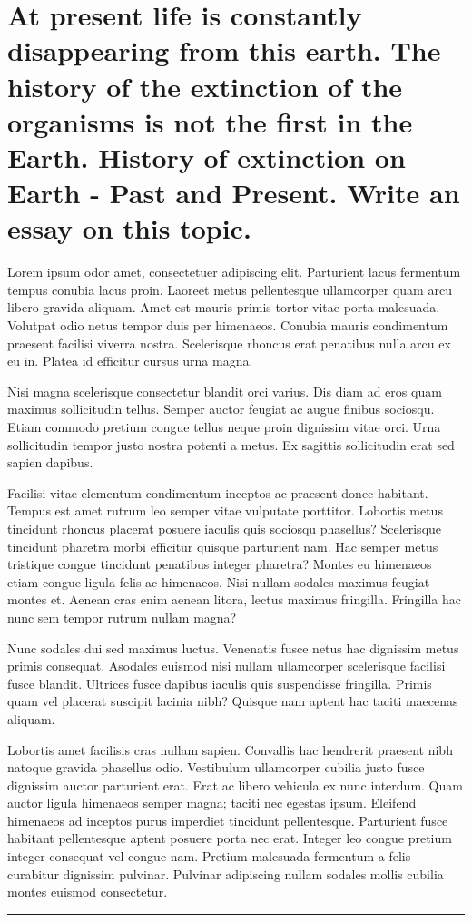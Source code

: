 \documentclass[12pt]{article}
\begin{document}
\section{At present life is constantly disappearing from this earth. The history of the extinction of the organisms is not the first in the Earth. History of extinction on Earth - Past and Present. Write an essay on this topic.}
Lorem ipsum odor amet, consectetuer adipiscing elit. Parturient lacus fermentum tempus conubia lacus proin. Laoreet metus pellentesque ullamcorper quam arcu libero gravida aliquam. Amet est mauris primis tortor vitae porta malesuada. Volutpat odio netus tempor duis per himenaeos. Conubia mauris condimentum praesent facilisi viverra nostra. Scelerisque rhoncus erat penatibus nulla arcu ex eu in. Platea id efficitur cursus urna magna.

Nisi magna scelerisque consectetur blandit orci varius. Dis diam ad eros quam maximus sollicitudin tellus. Semper auctor feugiat ac augue finibus sociosqu. Etiam commodo pretium congue tellus neque proin dignissim vitae orci. Urna sollicitudin tempor justo nostra potenti a metus. Ex sagittis sollicitudin erat sed sapien dapibus.

Facilisi vitae elementum condimentum inceptos ac praesent donec habitant. Tempus est amet rutrum leo semper vitae vulputate porttitor. Lobortis metus tincidunt rhoncus placerat posuere iaculis quis sociosqu phasellus? Scelerisque tincidunt pharetra morbi efficitur quisque parturient nam. Hac semper metus tristique congue tincidunt penatibus integer pharetra? Montes eu himenaeos etiam congue ligula felis ac himenaeos. Nisi nullam sodales maximus feugiat montes et. Aenean cras enim aenean litora, lectus maximus fringilla. Fringilla hac nunc sem tempor rutrum nullam magna?

Nunc sodales dui sed maximus luctus. Venenatis fusce netus hac dignissim metus primis consequat. Asodales euismod nisi nullam ullamcorper scelerisque facilisi fusce blandit. Ultrices fusce dapibus iaculis quis suspendisse fringilla. Primis quam vel placerat suscipit lacinia nibh? Quisque nam aptent hac taciti maecenas aliquam.

Lobortis amet facilisis cras nullam sapien. Convallis hac hendrerit praesent nibh natoque gravida phasellus odio. Vestibulum ullamcorper cubilia justo fusce dignissim auctor parturient erat. Erat ac libero vehicula ex nunc interdum. Quam auctor ligula himenaeos semper magna; taciti nec egestas ipsum. Eleifend himenaeos ad inceptos purus imperdiet tincidunt pellentesque. Parturient fusce habitant pellentesque aptent posuere porta nec erat. Integer leo congue pretium integer consequat vel congue nam. Pretium malesuada fermentum a felis curabitur dignissim pulvinar. Pulvinar adipiscing nullam sodales mollis cubilia montes euismod consectetur.
\vfill
\rule{\textwidth}{0.4pt}
\end{document}
